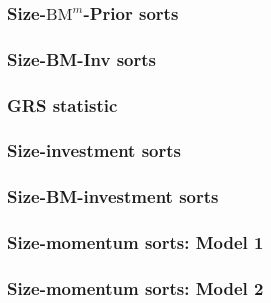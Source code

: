 \documentclass{beamer}
\begin{document}
\begin{frame}
\frametitle{Size-$\text{BM}^m$-Prior sorts}
\begin{center}
\resizebox*{!}{\dimexpr\textheight-1.3cm\relax}{
    
    }
\end{center}
\end{frame}

\begin{frame}
\frametitle{Size-BM-Inv sorts}
\begin{center}
\resizebox*{!}{\dimexpr\textheight-1.3cm\relax}{
    
    }
\end{center}
\end{frame}

\begin{frame}
\frametitle{GRS statistic}
\begin{center}
\resizebox*{!}{\dimexpr\textheight-1.3cm\relax}{
    
    }
\end{center}
\end{frame}

\begin{frame}
  \frametitle{Size-investment sorts}
  \begin{center}
  \resizebox*{!}{\dimexpr\textheight-1.3cm\relax}{
    
    }
  \end{center}
\end{frame}

\begin{frame}
  \frametitle{Size-BM-investment sorts}
  \begin{center}
  \resizebox*{!}{\dimexpr\textheight-1.3cm\relax}{
    
    }
  \end{center}
\end{frame}

\begin{frame}
  \frametitle{Size-momentum sorts: Model 1}
  \begin{center}
  \resizebox*{!}{\dimexpr\textheight-1.3cm\relax}{
    
    }
  \end{center}
\end{frame}

\begin{frame}
  \frametitle{Size-momentum sorts: Model 2}
  \begin{center}
  \resizebox*{!}{\dimexpr\textheight-1.3cm\relax}{
    
    }
  \end{center}
\end{frame}
\end{document}
